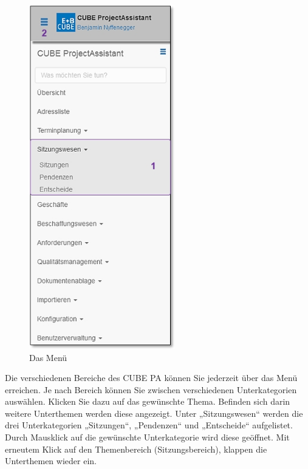 \begin{figure}   %
  \vspace{-25pt}      %
  \begin{center}
    \includegraphics[height=150mm]{../chapters/01_Einfuehrung/pictures/1-3-1_Menuuebersicht_oSitzungswesen.jpg}
  \end{center}
  \vspace{-20pt}
  \caption{Das Menü}
  \vspace{-10pt}
\end{figure}
Die verschiedenen Bereiche des CUBE PA können Sie jederzeit über das Menü erreichen. Je nach Bereich können Sie zwischen verschiedenen Unterkategorien auswählen. Klicken Sie dazu auf das gewünschte Thema. Befinden sich darin weitere Unterthemen werden diese angezeigt. Unter „Sitzungswesen“  werden die drei Unterkategorien „Sitzungen“, „Pendenzen“ und „Entscheide“ aufgelistet. Durch Mausklick auf die gewünschte Unterkategorie wird diese geöffnet. Mit erneutem Klick auf den Themenbereich (Sitzungsbereich), klappen die Unterthemen wieder ein. 


